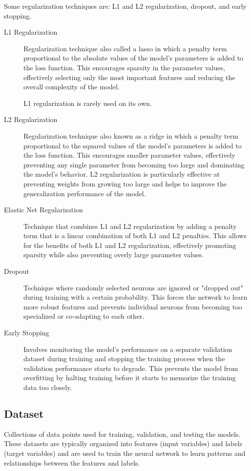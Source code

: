 \documentclass[a4paper]{report}
\begin{document}
Some regularization techniques are: L1 and L2 regularization, dropout, and early stopping.

\begin{description}
\item[L1 Regularization]
Regularization technique also called a lasso in which a penalty term proportional to the absolute values of the model's parameters is added to the loss function. This encourages sparsity in the parameter values, effectively selecting only the most important features and reducing the overall complexity of the model.

L1 regularization is rarely used on its own.

\item[L2 Regularization]
Regularization technique also known as a ridge in which a penalty term proportional to the squared values of the model's parameters is added to the loss function. This encourages smaller parameter values, effectively preventing any single parameter from becoming too large and dominating the model's behavior. L2 regularization is particularly effective at preventing weights from growing too large and helps to improve the generalization performance of the model.

\item[Elastic Net Regularization]
Technique that combines L1 and L2 regularization by adding a penalty term that is a linear combination of both L1 and L2 penalties. This allows for the benefits of both L1 and L2 regularization, effectively promoting sparsity while also preventing overly large parameter values.

\item[Dropout]
Technique where randomly selected neurons are ignored or "dropped out" during training with a certain probability. This forces the network to learn more robust features and prevents individual neurons from becoming too specialized or co-adapting to each other.

\item[Early Stopping]
Involves monitoring the model's performance on a separate validation dataset during training and stopping the training process when the validation performance starts to degrade. This prevents the model from overfitting by halting training before it starts to memorize the training data too closely.

\end{description}


\subsection*{Dataset}
Collections of data points used for training, validation, and testing the models. These datasets are typically organized into features (input variables) and labels (target variables) and are used to train the neural network to learn patterns and relationships between the features and labels.
\end{document}
